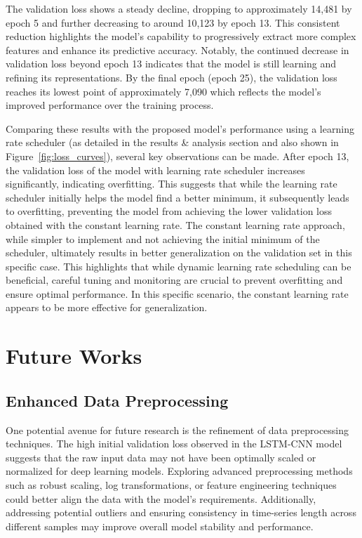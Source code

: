 \documentclass[conference]{IEEEtran}
\begin{document}
The validation loss shows a steady decline, dropping to approximately 14,481 by epoch 5 and further decreasing to around 10,123 by epoch 13. This consistent reduction highlights the model’s capability to progressively extract more complex features and enhance its predictive accuracy. Notably, the continued decrease in validation loss beyond epoch 13 indicates that the model is still learning and refining its representations. By the final epoch (epoch 25), the validation loss reaches its lowest point of approximately 7,090 which reflects the model's improved performance over the training process.

Comparing these results with the proposed model's performance using a learning rate scheduler (as detailed in the results \& analysis section and also shown in Figure~\ref{fig:loss_curves}), several key observations can be made. After epoch 13, the validation loss of the model with learning rate scheduler increases significantly, indicating overfitting. This suggests that while the learning rate scheduler initially helps the model find a better minimum, it subsequently leads to overfitting, preventing the model from achieving the lower validation loss obtained with the constant learning rate. The constant learning rate approach, while simpler to implement and not achieving the initial minimum of the scheduler, ultimately results in better generalization on the validation set in this specific case. This highlights that while dynamic learning rate scheduling can be beneficial, careful tuning and monitoring are crucial to prevent overfitting and ensure optimal performance. In this specific scenario, the constant learning rate appears to be more effective for generalization.


\section {Future Works}
\subsection{Enhanced Data Preprocessing}
One potential avenue for future research is the refinement of data preprocessing techniques. The high initial validation loss observed in the LSTM-CNN model suggests that the raw input data may not have been optimally scaled or normalized for deep learning models. Exploring advanced preprocessing methods such as robust scaling, log transformations, or feature engineering techniques could better align the data with the model's requirements. Additionally, addressing potential outliers and ensuring consistency in time-series length across different samples may improve overall model stability and performance.
\end{document}
